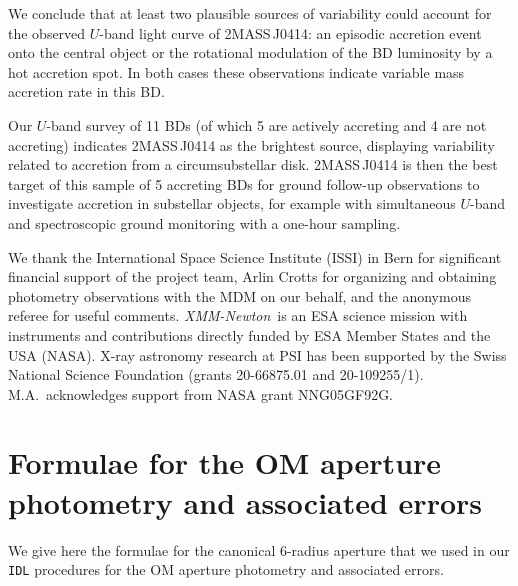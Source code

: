 \documentclass{aa}
\newcommand{\xmm}{{\it XMM-Newton}}
\begin{document}
We conclude that at least two plausible sources of variability could
account for the observed $U$-band light curve of 2MASS\,J0414: an episodic
accretion event onto the central object or the rotational modulation of the
BD luminosity by a hot accretion spot. In both cases these
observations indicate variable mass accretion rate in this BD.

Our $U$-band survey of 11 BDs (of which 5 are actively
accreting and 4 are not accreting) indicates 2MASS\,J0414 as
the brightest source,
displaying variability related to accretion from
a circumsubstellar disk. 2MASS\,J0414 is then the best target of this
sample of 5 accreting BDs for ground follow-up observations to
investigate accretion in substellar objects, for example
with simultaneous $U$-band and spectroscopic ground monitoring with a
one-hour sampling.

\begin{acknowledgements}
We thank the International Space Science Institute (ISSI) in Bern for
significant financial support of the project team, Arlin Crotts for
organizing and obtaining photometry observations with the MDM on our
behalf, and the anonymous referee for useful comments. \xmm~is an ESA
science mission with instruments and contributions directly funded by
ESA Member States and the USA (NASA). X-ray astronomy research at PSI
has been supported by the Swiss National Science Foundation (grants
20-66875.01 and 20-109255/1). M.A.\ acknowledges support from NASA
grant NNG05GF92G.
\end{acknowledgements}

\appendix

\section{Formulae for the OM aperture photometry and associated errors}
\label{appendix}

We give here the formulae for the canonical 6\arcsec-radius
aperture that we used in our {\tt IDL} procedures for the OM aperture
photometry and associated errors.
\end{document}
